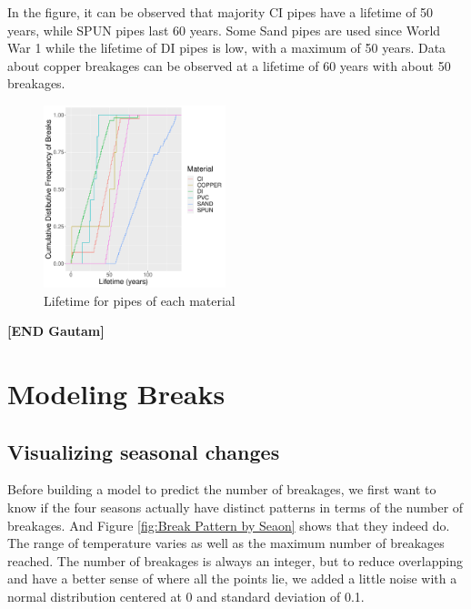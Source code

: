 \documentclass[twocolumn]{article}
\begin{document}
 In the figure, it can be observed that majority CI pipes have a lifetime of 50 years, while SPUN pipes last 60 years. Some Sand pipes are used since World War 1 while the lifetime of DI pipes is low, with a maximum of 50 years. Data about copper breakages can be observed at a lifetime of 60 years with about 50 breakages.  

\begin{figure}[H]
    \includegraphics[width=\columnwidth,height=200px]{Gautam/lifetime.pdf}
    \caption{Lifetime for pipes of each material}
    \label{fig:Material vs Lifetime}
\end{figure}

\textbf{[END Gautam]}


\section{Modeling Breaks}


\subsection{Visualizing seasonal changes}

Before building a model to predict the number of breakages, we first want to know if the four seasons actually have distinct patterns in terms of the number of breakages. And Figure \ref{fig:Break Pattern by Seaon} shows that they indeed do. The range of temperature varies as well as the maximum number of breakages reached. The number of breakages is always an integer, but to reduce overlapping and have a better sense of where all the points lie, we added a little noise with a normal distribution centered at 0 and standard deviation of 0.1. 
\end{document}
